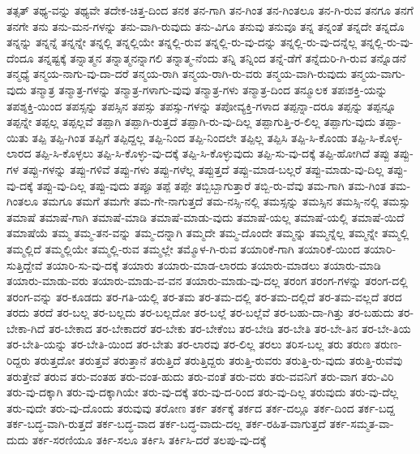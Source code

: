 {ತತ್ಸತ್
ತಥ್ಯ-ವನ್ನು
ತಥ್ಯವೇ
ತದೇಕ-ಚಿತ್ತ-ದಿಂದ
ತನಕ
ತನ-ಗಾಗಿ
ತನ-ಗಿಂತ
ತನ-ಗಿಂತಲೂ
ತನ-ಗಿ-ರುವ
ತನಗೂ
ತನಗೆ
ತನಗೇ
ತನು
ತನು-ಮನ-ಗಳನ್ನು
ತನು-ವಾಗಿ-ರುವುದು
ತನು-ವಿಗೂ
ತನುವು
ತನುವೂ
ತನ್ನ
ತನ್ನಂತೆ
ತನ್ನದೇ
ತನ್ನದೊ
ತನ್ನನ್ನು
ತನ್ನನ್ನೆ
ತನ್ನನ್ನೇ
ತನ್ನಲ್ಲಿ
ತನ್ನಲ್ಲಿಯೇ
ತನ್ನಲ್ಲಿ-ರುವ
ತನ್ನಲ್ಲಿ-ರು-ವು-ದನ್ನು
ತನ್ನಲ್ಲಿ-ರು-ವು-ದನ್ನೆಲ್ಲ
ತನ್ನಲ್ಲಿ-ರು-ವು-ದೆಂದೂ
ತನ್ನಷ್ಟಕ್ಕೆ
ತನ್ನಾತ್ಮನ
ತನ್ನಾತ್ಮನನ್ನಾಗಲಿ
ತನ್ನಾತ್ಮ-ನೆಂದು
ತನ್ನಿ
ತನ್ನಿಂದ
ತನ್ನೆ-ಡೆಗೆ
ತನ್ನೆದುರಿ-ಗಿ-ರುವ
ತನ್ನೊಡನೆ
ತನ್ಮಧ್ಯೆ
ತನ್ಮಯ-ನಾಗು-ವು-ದಾ-ದರೆ
ತನ್ಮಯ-ರಾಗಿ
ತನ್ಮಯ-ರಾಗಿ-ರು-ವರು
ತನ್ಮಯ-ವಾಗಿ-ರುವುದು
ತನ್ಮಯ-ವಾಗು-ವುದು
ತನ್ಮಾತ್ರ
ತನ್ಮಾತ್ರ-ಗಳನ್ನು
ತನ್ಮಾತ್ರ-ಗಳಾಗು-ವುವು
ತನ್ಮಾತ್ರ-ಗಳು
ತನ್ಮಾತ್ರ-ದಿಂದ
ತನ್ಮೂಲಕ
ತಪಃಶಕ್ತಿ-ಯನ್ನು
ತಪಶ್ಶಕ್ತಿ-ಯಿಂದ
ತಪಸ್ಸನ್ನು
ತಪಸ್ಸಿನ
ತಪಸ್ಸು
ತಪಸ್ಸು-ಗಳನ್ನು
ತಪೋವ್ಯಕ್ತಿ-ಗಳಾದ
ತಪ್ಪನ್ನಾ-ದರೂ
ತಪ್ಪನ್ನು
ತಪ್ಪನ್ನೂ
ತಪ್ಪನ್ನೇ
ತಪ್ಪಲ್ಲ
ತಪ್ಪಲ್ಲವೆ
ತಪ್ಪಾಗಿ
ತಪ್ಪಾಗಿ-ರುತ್ತದೆ
ತಪ್ಪಾಗಿ-ರು-ವು-ದಿಲ್ಲ
ತಪ್ಪಾಗುತ್ತಿ-ರ-ಲಿಲ್ಲ
ತಪ್ಪಾಗು-ವುದು
ತಪ್ಪಾ-ಯಿತು
ತಪ್ಪಿ
ತಪ್ಪಿ-ಗಿಂತ
ತಪ್ಪಿಗೆ
ತಪ್ಪಿದ್ದಲ್ಲ
ತಪ್ಪಿ-ನಿಂದ
ತಪ್ಪಿ-ನಿಂದಲೇ
ತಪ್ಪಿಲ್ಲ
ತಪ್ಪಿಸಿ
ತಪ್ಪಿ-ಸಿ-ಕೊಂಡು
ತಪ್ಪಿ-ಸಿ-ಕೊಳ್ಳ-ಲಾರದ
ತಪ್ಪಿ-ಸಿ-ಕೊಳ್ಳಲು
ತಪ್ಪಿ-ಸಿ-ಕೊಳ್ಳು-ವು-ದಕ್ಕೆ
ತಪ್ಪಿ-ಸಿ-ಕೊಳ್ಳುವುದು
ತಪ್ಪಿ-ಸು-ವು-ದಕ್ಕೆ
ತಪ್ಪಿ-ಹೋಗಿದೆ
ತಪ್ಪು
ತಪ್ಪು-ಗಳ
ತಪ್ಪು-ಗಳನ್ನು
ತಪ್ಪು-ಗಳಿವೆ
ತಪ್ಪು-ಗಳು
ತಪ್ಪು-ಗಳೆಲ್ಲ
ತಪ್ಪುತ್ತದೆ
ತಪ್ಪು-ಮಾಡ-ಬಲ್ಲರೆ
ತಪ್ಪು-ಮಾಡು-ವು-ದಿಲ್ಲ
ತಪ್ಪು-ವು-ದಕ್ಕೆ
ತಪ್ಪು-ವು-ದಿಲ್ಲ
ತಪ್ಪು-ವುದು
ತಪ್ಪೂ
ತಪ್ಪೆ
ತಪ್ಪೇ
ತಬ್ಬಿಬ್ಬಾಗುತ್ತಾರೆ
ತಬ್ಬಿ-ರು-ವೆವು
ತಮ-ಗಾಗಿ
ತಮ-ಗಿಂತ
ತಮ-ಗಿಂತಲೂ
ತಮಗೂ
ತಮಗೆ
ತಮಗೇ
ತಮ-ಗೇ-ನಾಗುತ್ತದೆ
ತಮ-ನಸ್ಸಿ-ನಲ್ಲಿ
ತಮಸ್ಸನ್ನು
ತಮಸ್ಸಿನ
ತಮಸ್ಸಿ-ನಲ್ಲಿ
ತಮಸ್ಸು
ತಮಾಷೆ
ತಮಾಷೆ-ಗಾಗಿ
ತಮಾಷೆ-ಮಾಡಿ
ತಮಾಷೆ-ಮಾಡು-ವುದು
ತಮಾಷೆ-ಯಲ್ಲ
ತಮಾಷೆ-ಯಲ್ಲಿ
ತಮಾಷೆ-ಯಿದೆ
ತಮಾಷೆಯೆ
ತಮ್ಮ
ತಮ್ಮ-ತನ-ವನ್ನು
ತಮ್ಮ-ದನ್ನಾಗಿ
ತಮ್ಮದೇ
ತಮ್ಮ-ದೊಂದೇ
ತಮ್ಮನ್ನು
ತಮ್ಮನ್ನೆಲ್ಲ
ತಮ್ಮನ್ನೇ
ತಮ್ಮಲ್ಲಿ
ತಮ್ಮಲ್ಲಿದೆ
ತಮ್ಮಲ್ಲಿಯೇ
ತಮ್ಮಲ್ಲಿ-ರುವ
ತಮ್ಮಲ್ಲೇ
ತಮ್ಮೊಳ-ಗಿ-ರುವ
ತಯಾರಿಕೆ-ಗಾಗಿ
ತಯಾರಿಕೆ-ಯಿಂದ
ತಯಾರಿ-ಸುತ್ತಿದ್ದೇವೆ
ತಯಾರಿ-ಸು-ವು-ದಕ್ಕೆ
ತಯಾರು
ತಯಾರು-ಮಾಡ-ಲಾರದು
ತಯಾರು-ಮಾಡಲು
ತಯಾರು-ಮಾಡಿ
ತಯಾರು-ಮಾಡು-ವರು
ತಯಾರು-ಮಾಡು-ವ-ವನ
ತಯಾರು-ಮಾಡು-ವು-ದಲ್ಲ
ತರಂಗ
ತರಂಗ-ಗಳನ್ನು
ತರಂಗ-ದಲ್ಲಿ
ತರಂಗ-ವನ್ನು
ತರ-ಕೂಡದು
ತರ-ಗತಿ-ಯಲ್ಲಿ
ತರ-ತಮ
ತರ-ತಮ-ದಲ್ಲಿ
ತರ-ತಮ-ದಲ್ಲಿದೆ
ತರ-ತಮ-ವಲ್ಲದೆ
ತರದ
ತರದು
ತರದೆ
ತರ-ಬಲ್ಲ
ತರ-ಬಲ್ಲದು
ತರ-ಬಲ್ಲದೋ
ತರ-ಬಲ್ಲೆ
ತರ-ಬಲ್ಲೆವೆ
ತರ-ಬಹು-ದಾ-ಗಿತ್ತು
ತರ-ಬಹುದು
ತರ-ಬೇಕಾ-ಗಿದೆ
ತರ-ಬೇಕಾದ
ತರ-ಬೇಕಾದರೆ
ತರ-ಬೇಕು
ತರ-ಬೇಕೆಂಬ
ತರ-ಬೇಡಿ
ತರ-ಬೇತಿ
ತರ-ಬೇ-ತಿನ
ತರ-ಬೇ-ತಿಯ
ತರ-ಬೇತಿ-ಯನ್ನು
ತರ-ಬೇತಿ-ಯಿಂದ
ತರ-ಬೇತು
ತರ-ಲಾರವು
ತರ-ಲಿಲ್ಲ
ತರಲು
ತರಿಸ-ಬಲ್ಲ
ತರು
ತರುಣ
ತರುಣ-ರಿದ್ದರು
ತರುತ್ತದೋ
ತರುತ್ತವೆ
ತರುತ್ತಾನೆ
ತರುತ್ತಿದೆ
ತರುತ್ತಿದ್ದರು
ತರುತ್ತಿ-ರುವರು
ತರುತ್ತಿ-ರು-ವುದು
ತರುತ್ತಿ-ರುವೆವು
ತರುತ್ತೇವೆ
ತರುವ
ತರು-ವಂತಹ
ತರು-ವಂತ-ಹುದು
ತರು-ವಂತೆ
ತರು-ವರು
ತರು-ವವನಿಗೆ
ತರು-ವಾಗ
ತರು-ವಿರಿ
ತರು-ವು-ದಕ್ಕಾಗಿ
ತರು-ವು-ದಕ್ಕಾಗಿಯೇ
ತರು-ವು-ದಕ್ಕೆ
ತರು-ವು-ದ-ರಿಂದ
ತರು-ವು-ದಿಲ್ಲ
ತರುವುದು
ತರು-ವು-ದೆಲ್ಲ
ತರು-ವುದೇ
ತರು-ವು-ದೊಂದು
ತರುವುವು
ತರೋಣ
ತರ್ಕ
ತರ್ಕಕ್ಕೆ
ತರ್ಕದ
ತರ್ಕ-ದಲ್ಲೂ
ತರ್ಕ-ದಿಂದ
ತರ್ಕ-ಬದ್ದ
ತರ್ಕ-ಬದ್ಧ-ವಾಗಿ-ರುತ್ತದೆ
ತರ್ಕ-ಬದ್ಧ-ವಾದ
ತರ್ಕ-ಬದ್ಧ-ವಾದು-ದಲ್ಲ
ತರ್ಕ-ರಹಿತ-ವಾಗುತ್ತದೆ
ತರ್ಕ-ಸಮ್ಮತ-ವಾ-ದುದು
ತರ್ಕ-ಸರಣಿಯೂ
ತರ್ಕಿ-ಸಲೂ
ತರ್ಕಿಸಿ
ತರ್ಕಿಸಿ-ದರೆ
ತಲಪು-ವು-ದಕ್ಕೆ
}
